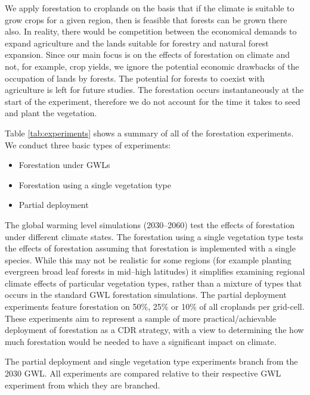 \documentclass[]{article}
\begin{document}
We apply forestation to croplands on the basis that if the climate is suitable to grow crops for a given region, then is feasible that forests can be grown there also. In reality, there would be competition between the economical demands to expand agriculture and the lands suitable for forestry and natural forest expansion.
Since our main focus is on the effects of forestation on climate and not, for example, crop yields, we ignore the potential economic drawbacks of the occupation of lands by forests.
The potential for forests to coexist with agriculture is left for future studies.
The forestation occurs instantaneously at the start of the experiment, therefore we do not account for the time it takes to seed and plant the vegetation.

Table \ref{tab:experiments} shows a summary of all of the forestation experiments. We conduct three basic types of experiments:

\begin{itemize}
    \item Forestation under GWLs
    \item Forestation using a single vegetation type
    \item Partial deployment
\end{itemize}

The global warming level simulations (2030–2060) test the effects of forestation under different climate states.
The forestation using a single vegetation type tests the effects of forestation assuming that forestation is implemented with a single species.
While this may not be realistic for some regions (for example planting evergreen broad leaf forests in mid–high latitudes) it simplifies examining regional climate effects of particular vegetation types, rather than a mixture of types that occurs in the standard GWL forestation simulations.
The partial deployment experiments feature forestation on 50\%, 25\% or 10\% of all croplands per grid-cell.
These experiments aim to represent a sample of more practical/achievable deployment of forestation as a CDR strategy, with a view to determining the how much forestation would be needed to have a significant impact on climate.

The partial deployment and single vegetation type experiments branch from the 2030 GWL.
All experiments are compared relative to their respective GWL experiment from which they are branched.
\end{document}
